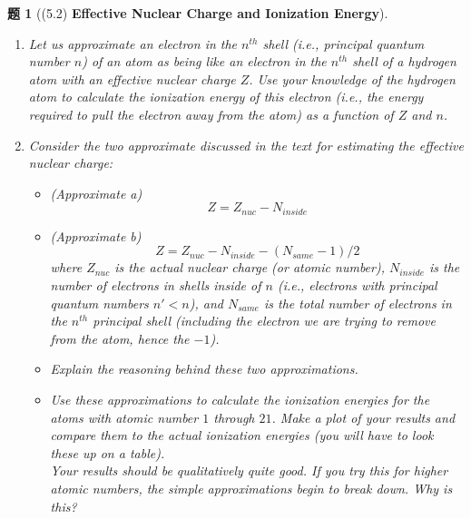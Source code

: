 \documentclass[UTF8,10pt,a4paper]{article}
\theoremstyle{Problem}
\newtheorem{prob}{题}
\theoremstyle{Solution}
\begin{document}
\thispagestyle{FirstPageStyle}
\begin{prob}[(5.2) \textbf{Effective Nuclear Charge and Ionization Energy}]
    \begin{enumerate}
        \item[(a)] Let us approximate an electron in the $n^{th}$ shell (i.e., principal quantum number $n$) of an atom as being like an electron in the $n^{th}$ shell of a hydrogen atom with an effective nuclear charge $Z$. Use your knowledge of the hydrogen atom to calculate the ionization energy of this electron (i.e., the energy required to pull the electron away from the atom) as a function of $Z$ and $n$.
        \item[(b)] Consider the two approximate discussed in the text for estimating the effective nuclear charge:
        \begin{itemize}
            \item (Approximate a)
            \[
                Z=Z_{nuc}-N_{inside}
            \]
            \item (Approximate b)
            \[
                Z=Z_{nuc}-N_{inside}-(N_{same}-1)/2
            \]
            where $Z_{nuc}$ is the actual nuclear charge (or atomic number), $N_{inside}$ is the number of electrons in shells inside of $n$ (i.e., electrons with principal quantum numbers $n'<n$), and $N_{same}$ is the total number of electrons in the $n^{th}$ principal shell (including the electron we are trying to remove from the atom, hence the $-1$).
        \end{itemize}
        \begin{itemize}
            \item[$\triangleright$] Explain the reasoning behind these two approximations.
            \item[$\triangleright$] Use these approximations to calculate the ionization energies for the atoms with atomic number $1$ through $21$. Make a plot of your results and compare them to the actual ionization energies (you will have to look these up on a table).\\
            Your results should be qualitatively quite good. If you try this for higher atomic numbers, the simple approximations begin to break down. Why is this?
        \end{itemize}
    \end{enumerate}
\end{prob}
\end{document}
